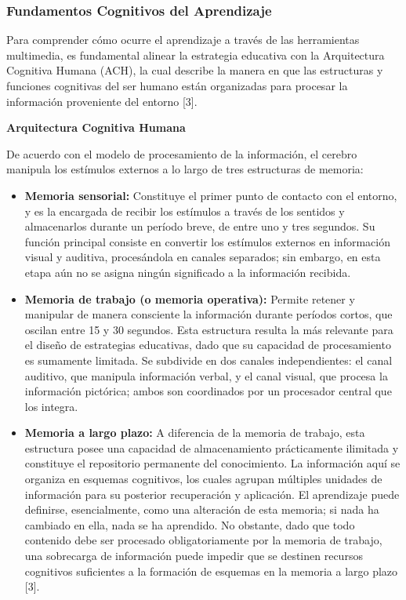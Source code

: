 \documentclass[11pt]{article}
\begin{document}
\subsubsection*{Fundamentos Cognitivos del Aprendizaje}
Para comprender cómo ocurre el aprendizaje a través de las herramientas multimedia, es fundamental alinear la estrategia educativa con la Arquitectura Cognitiva Humana (ACH), la cual describe la manera en que las estructuras y funciones cognitivas del ser humano están organizadas para procesar la información proveniente del entorno [3].

\textbf{Arquitectura Cognitiva Humana}

De acuerdo con el modelo de procesamiento de la información, el cerebro manipula los estímulos externos a lo largo de tres estructuras de memoria:

\begin{itemize}
    \item \textbf{Memoria sensorial:} Constituye el primer punto de contacto con el entorno, y es la encargada de recibir los estímulos a través de los sentidos y almacenarlos durante un período breve, de entre uno y tres segundos. Su función principal consiste en convertir los estímulos externos en información visual y auditiva, procesándola en canales separados; sin embargo, en esta etapa aún no se asigna ningún significado a la información recibida.
    \item \textbf{Memoria de trabajo (o memoria operativa):} Permite retener y manipular de manera consciente la información durante períodos cortos, que oscilan entre 15 y 30 segundos. Esta estructura resulta la más relevante para el diseño de estrategias educativas, dado que su capacidad de procesamiento es sumamente limitada. Se subdivide en dos canales independientes: el canal auditivo, que manipula información verbal, y el canal visual, que procesa la información pictórica; ambos son coordinados por un procesador central que los integra.
    \item \textbf{Memoria a largo plazo:} A diferencia de la memoria de trabajo, esta estructura posee una capacidad de almacenamiento prácticamente ilimitada y constituye el repositorio permanente del conocimiento. La información aquí se organiza en esquemas cognitivos, los cuales agrupan múltiples unidades de información para su posterior recuperación y aplicación. El aprendizaje puede definirse, esencialmente, como una alteración de esta memoria; si nada ha cambiado en ella, nada se ha aprendido. No obstante, dado que todo contenido debe ser procesado obligatoriamente por la memoria de trabajo, una sobrecarga de información puede impedir que se destinen recursos cognitivos suficientes a la formación de esquemas en la memoria a largo plazo [3].
\end{itemize}
\end{document}
